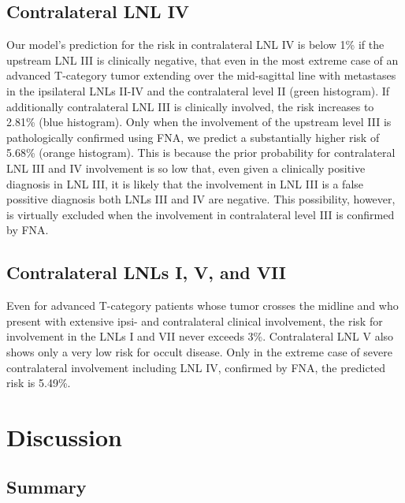 \documentclass[
  sn-mathphys-num,
]{sn-jnl}
\begin{document}
\subsection{Contralateral LNL IV}\label{contralateral-lnl-iv}

Our model's prediction for the risk in contralateral LNL IV is below 1\%
if the upstream LNL III is clinically negative, that even in the most
extreme case of an advanced T-category tumor extending over the
mid-sagittal line with metastases in the ipsilateral LNLs II-IV and the
contralateral level II (green histogram). If additionally contralateral
LNL III is clinically involved, the risk increases to 2.81\% (blue
histogram). Only when the involvement of the upstream level III is
pathologically confirmed using FNA, we predict a substantially higher
risk of 5.68\% (orange histogram). This is because the prior probability
for contralateral LNL III and IV involvement is so low that, even given
a clinically positive diagnosis in LNL III, it is likely that the
involvement in LNL III is a false possitive diagnosis both LNLs III and
IV are negative. This possibility, however, is virtually excluded when
the involvement in contralateral level III is confirmed by FNA.

\subsection{Contralateral LNLs I, V, and
VII}\label{contralateral-lnls-i-v-and-vii}

Even for advanced T-category patients whose tumor crosses the midline
and who present with extensive ipsi- and contralateral clinical
involvement, the risk for involvement in the LNLs I and VII never
exceeds 3\%. Contralateral LNL V also shows only a very low risk for
occult disease. Only in the extreme case of severe contralateral
involvement including LNL IV, confirmed by FNA, the predicted risk is
5.49\%.

\section{Discussion}\label{sec-discussion}

\subsection{Summary}\label{summary}
\end{document}
